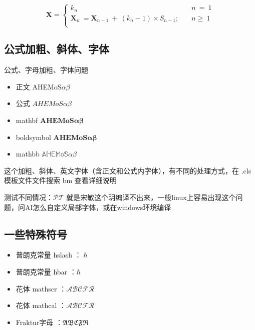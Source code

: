 \documentclass[AutoFakeBold]{LZUThesis}
\begin{document}
\begin{equation}\label{eq:multi}
    \mathbf{X}=
    \begin{cases}
        k_n \quad & n \ = \ 1  \\
        \mathbf{X}_n \ = \mathbf{X}_{n-1}\ +\ (k_n-1)\times S_{n-1};
        \quad     & n \geq \ 1 \\
    \end{cases}
\end{equation}

\subsection{公式加粗、斜体、字体}

公式、字母加粗、字体问题

\begin{itemize}
    \item[1.] 正文 \qquad \quad AHEMoS$\alpha \beta$
    \item[2.] 公式 \qquad \quad $AHEMoS \alpha \beta$
    \item[3.] mathbf \qquad $\mathbf{AHEMoS\alpha \beta}$
    \item[4.] boldsymbol $\boldsymbol{AHEMoS\alpha \beta}$
    \item[5.] mathbb \qquad $\mathbb{AHEMoS\alpha \beta}$
\end{itemize}

这个加粗、斜体、英文字体（含正文和公式内字体），有不同的处理方式，在 .cls 模板文件文件搜索 bm 查看详细说明


测试不同情况：$\mathcal{P}\mathcal{T}$ 就是宋敏这个玥编译不出来，一般linux上容易出现这个问题，问AI怎么自定义局部字体，或在windows环境编译

\subsection{一些特殊符号}

\begin{itemize}
    \item 普朗克常量 hslash ：$\hslash$
    \item 普朗克常量 hbar ：$\hbar$
    \item 花体 mathscr ：$\mathscr{ABCFR}$
    \item 花体 mathcal ：$\mathcal{ABCFR}$
    \item Fraktur字母 ：$\mathfrak{ABCFR}$
\end{itemize}
\end{document}
